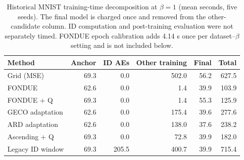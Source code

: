 \begin{table}[H]
\caption{Historical MNIST training-time decomposition at $\beta=1$ (mean seconds, five seeds). The final model is charged once and removed from the other-candidate column. ID computation and post-training evaluation were not separately timed. FONDUE epoch calibration adds 4.14 s once per dataset--$\beta$ setting and is not included below.}\label{tab:cost}
\footnotesize
\setlength{\tabcolsep}{3.5pt}
\begin{tabular*}{\textwidth}{@{\extracolsep{\fill}}lrrrrr@{}}
\toprule
Method & Anchor & ID AEs & Other training & Final & Total \\
\midrule
Grid (MSE) & 69.3 & 0.0 & 502.0 & 56.2 & 627.5 \\
FONDUE & 62.6 & 0.0 & 1.4 & 39.9 & 103.9 \\
FONDUE + Q & 69.3 & 0.0 & 1.4 & 55.3 & 125.9 \\
GECO adaptation & 62.6 & 0.0 & 175.4 & 39.6 & 277.6 \\
ARD adaptation & 62.6 & 0.0 & 138.0 & 37.6 & 238.2 \\
Ascending + Q & 69.3 & 0.0 & 72.8 & 39.9 & 182.0 \\
Legacy ID window & 69.3 & 205.5 & 400.7 & 39.9 & 715.4 \\
\bottomrule
\end{tabular*}
\end{table}
